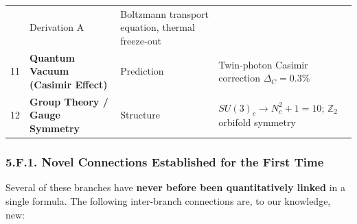 \documentclass[
  11pt,
]{article}
\begin{document}
\begin{longtable}[]{@{}llll@{}}
\begin{minipage}[t]{0.27\columnwidth}
\end{minipage} & \begin{minipage}[t]{0.29\columnwidth}\raggedright
Derivation A\strut
\end{minipage} & \begin{minipage}[t]{0.29\columnwidth}\raggedright
Boltzmann transport equation, thermal freeze-out\strut
\end{minipage}\tabularnewline
\begin{minipage}[t]{0.04\columnwidth}\raggedright
11\strut
\end{minipage} & \begin{minipage}[t]{0.27\columnwidth}\raggedright
\textbf{Quantum Vacuum (Casimir Effect)}\strut
\end{minipage} & \begin{minipage}[t]{0.29\columnwidth}\raggedright
Prediction\strut
\end{minipage} & \begin{minipage}[t]{0.29\columnwidth}\raggedright
Twin-photon Casimir correction \(\Delta_C = 0.3\%\)\strut
\end{minipage}\tabularnewline
\begin{minipage}[t]{0.04\columnwidth}\raggedright
12\strut
\end{minipage} & \begin{minipage}[t]{0.27\columnwidth}\raggedright
\textbf{Group Theory / Gauge Symmetry}\strut
\end{minipage} & \begin{minipage}[t]{0.29\columnwidth}\raggedright
Structure\strut
\end{minipage} & \begin{minipage}[t]{0.29\columnwidth}\raggedright
\(SU(3)_c \to N_c^2+1 = 10\); \(\mathbb{Z}_2\) orbifold symmetry\strut
\end{minipage}\tabularnewline
\bottomrule
\end{longtable}

\hypertarget{f.1.-novel-connections-established-for-the-first-time}{%
\subsubsection{5.F.1. Novel Connections Established for the First
Time}\label{f.1.-novel-connections-established-for-the-first-time}}

Several of these branches have \textbf{never before been quantitatively
linked} in a single formula. The following inter-branch connections are,
to our knowledge, new:
\end{document}
